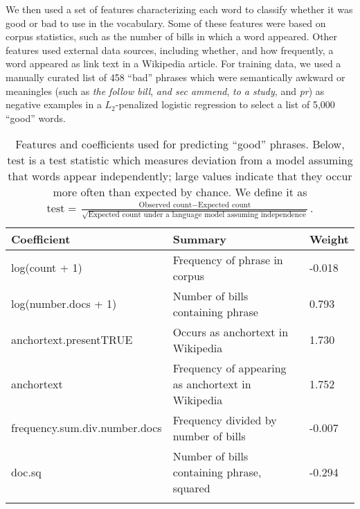 We then used a set of features characterizing each word to classify
whether it was good or bad to use in the vocabulary.  Some of these
features were based on corpus statistics, such as the number of bills
in which a word appeared.  Other features used external data sources,
including whether, and how frequently, a word appeared as link text in
a Wikipedia article. For training data, we used a manually curated
list of 458 ``bad'' phrases which were semantically awkward or
meaningles (such as \emph{the follow bill}, \emph{and sec ammend},
\emph{to a study}, and \emph{pr}) as negative examples in a
$L_2$-penalized logistic regression to select a list of 5,000 ``good''
words.

\begin{table*}
  \caption{Features and coefficients used for predicting ``good''
  phrases.  Below, $\mbox{test}$ is a test statistic which measures
  deviation from a model assuming that words appear independently;
  large values indicate that they occur more often than expected by
  chance.  We define it as $\mbox{test}=\frac{\mbox{Observed count} -
  \mbox{Expected count}}{\sqrt{\mbox{Expected count under a language
  model assuming independence}}}$.} 
\begin{center}
  \begin{tabular}{|p{6.0cm}|p{6.7cm}|p{1.0cm}|}
      \hline
  \textcolor{black} {} 
      \textbf{Coefficient} &   \textcolor{black} {} \textbf{Summary} &   \textcolor{black} {} \textbf{Weight} \\
      \hline
      \textcolor{black} {}
      log(count + 1) & \textcolor{black}{}Frequency of phrase in corpus & \textcolor{black}{}-0.018 \\ \textcolor{black} {}
      log(number.docs + 1) & \textcolor{black}{}Number of bills containing phrase & \textcolor{black}{}0.793 \\ \textcolor{black} {}
      anchortext.presentTRUE & \textcolor{black}{}Occurs as anchortext in Wikipedia & \textcolor{black}{}1.730 \\ \textcolor{black} {}
      anchortext & \textcolor{black}{}Frequency of appearing as anchortext in Wikipedia & \textcolor{black}{}1.752 \\ \textcolor{black} {}
      frequency.sum.div.number.docs & \textcolor{black}{}Frequency divided by number of bills & \textcolor{black}{}-0.007 \\ \textcolor{black} {}
      doc.sq & \textcolor{black}{}Number of bills containing phrase, squared & \textcolor{black}{}-0.294 \\ \textcolor{black} {}

\end{tabular}
\end{center}
\end{table*}
